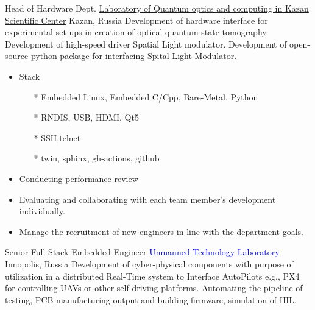         {Head of Hardware Dept.}
        {\href{http://kfti.knc.ru/}{\color{blue}Laboratory of Quantum optics and  computing  in  Kazan Scientific Center}}
        {Kazan, Russia}
        {
        \newline
        Development of hardware interface for experimental set ups in creation of optical quantum state tomography. 
        Development of high-speed driver Spatial Light modulator.
        Development of open-source \href{https://pypi.org/project/holoeye-embedded/}{\color{blue}python package} for interfacing Spital-Light-Modulator.    
        } 
        {
        \begin{itemize}
            \item Stack
                \begin{itemize}
                \item[*] Embedded Linux, Embedded C/Cpp, Bare-Metal, Python
                \item[*] RNDIS, USB, HDMI, Qt5
                \item[*] SSH,telnet
                \item[*] twin, sphinx, gh-actions, github
                \end{itemize}
            \item Conducting performance review
            \item Evaluating and collaborating with each team member’s development individually.
            \item Manage the recruitment of new engineers in line with the department goals.
        \end{itemize}
        }
        {Senior Full-Stack Embedded Engineer}
        {\href{https://robotics.innopolis.university/en/labs/laboratoriya-bespilotnyh-technologyi/}{\textcolor{blue}{Unmanned Technology Laboratory}}}
        {Innopolis, Russia}
        {
        \newline
        Development of cyber-physical components with purpose of utilization in a distributed Real-Time system to Interface AutoPilots e.g., PX4 for controlling UAVs or other self-driving platforms. Automating the pipeline of testing, PCB manufacturing output and building firmware, simulation of HIL.
        } 
